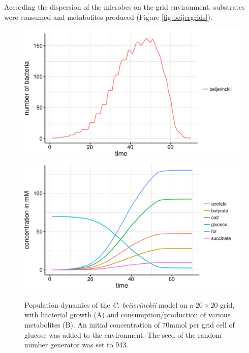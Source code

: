 According the dispersion of the microbes on the grid environment, substrates were consumed and metabolites produced (Figure \hyperref[fig:beijergrids]{\ref{fig:beijergrids}}).
\begin{figure}[h!]
  \centering
    \includegraphics[scale=0.45]{../results/beijerinckii_20x20_seed943_growth.pdf}
    \includegraphics[scale=0.45]{../results/beijerinckii_20x20_seed943_subs.pdf}
  \caption{Population dynamics of the \emph{C. beijerinckii} model on a $20\times20$ grid, with bacterial growth (A) and consumption/production of various metabolites (B). An initial concentration of 70\;mmol per grid cell of glucose was added to the environment. The seed of the random number generator was set to 943.}
  \label{fig:beijersg}
\end{figure}
